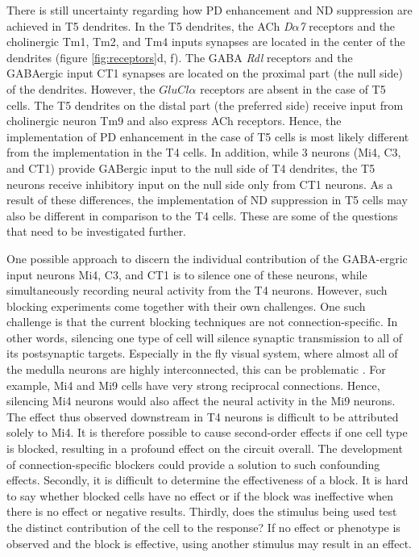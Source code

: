 There is still uncertainty regarding how PD enhancement and ND suppression are achieved in T5 dendrites. In the T5 dendrites, the ACh \textit{D$\alpha$7} receptors and the cholinergic Tm1, Tm2, and Tm4 inputs synapses are located in the center of the dendrites (figure \ref{fig:receptors}d, f). The GABA \textit{Rdl} receptors and the GABAergic input CT1 synapses are located on the proximal part (the null side) of the dendrites. However, the \textit{$GluCl\alpha$} receptors are absent in the case of T5 cells. The T5 dendrites on the distal part (the preferred side) receive input from cholinergic neuron Tm9 and also express ACh receptors. Hence, the implementation of PD enhancement in the case of T5 cells is most likely different from the implementation in the T4 cells. In addition, while 3 neurons (Mi4, C3, and CT1) provide GABergic input to the null side of T4 dendrites, the T5 neurons receive inhibitory input on the null side only from CT1 neurons. As a result of these differences, the implementation of ND suppression in T5 cells may also be different in comparison to the T4 cells. These are some of the questions that need to be investigated further. 

One possible approach to discern the individual contribution of the GABA-ergric input neurons Mi4, C3, and CT1 is to silence one of these neurons, while simultaneously recording neural activity from the T4 neurons. However, such blocking experiments come together with their own challenges. One such challenge is that the current blocking techniques are not connection-specific. In other words, silencing one type of cell will silence synaptic transmission to all of its postsynaptic targets. Especially in the fly visual system, where almost all of the medulla neurons are highly interconnected, this can be problematic \parencite{Takemura2017}. For example, Mi4 and Mi9 cells have very strong reciprocal connections. Hence, silencing Mi4 neurons would also affect the neural activity in the Mi9 neurons. The effect thus observed downstream in T4 neurons is difficult to be attributed solely to Mi4. It is therefore possible to cause second-order effects if one cell type is blocked, resulting in a profound effect on the circuit overall. The development of connection-specific blockers could provide a solution to such confounding effects. Secondly, it is difficult to determine the effectiveness of a block. It is hard to say whether blocked cells have no effect or if the block was ineffective when there is no effect or negative results. Thirdly, does the stimulus being used test the distinct contribution of the cell to the response? If no effect or phenotype is observed and the block is effective, using another stimulus may result in an effect.

